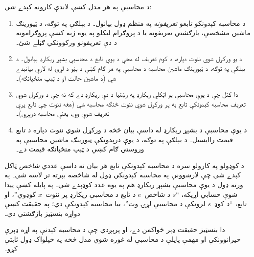 \documentclass[../../../include/open-logic-section]{subfiles}
\begin{document}

د محاسبې په هر مدل کښې لاندې کارونه کېدے شي:
\begin{enumerate}
\item د محاسبه کېدونکو تابعو \emph{تعريفونه} په منظم ډول بيانول۔ د
  بېلګې په توګه، د ټيورينګ ماشين مشخصې، بازګشتي تعريفونه يا د پروګرام
  ليکلو په يوه ژبه کښې پروګرامونه د دې تعريفونو ورکوونکي ګڼلے شئ۔
\item د يو ورکړل شوي ننوت دپاره، د کوم تعريف له مخې د يوې تابع د
  محاسبې بشپړ ريکارډ بيانول۔ د بېلګې په توګه، د ټيورينګ ماشين محاسبه
  د محاسبې په هر ګام کښې د بڼو د لړۍ له لارې بيانېدے شي (د ماشين
  حالت او د ټېپ منځپانګه)۔
\item دا کتل چې د يوې محاسبې يو اټکلي ريکارډ په رښتيا د دې ريکارډ دے
  که نه چې د ورکړل شوي تعريف محاسبه کېدونکې تابع به پر ورکړل شوي ننوت
  څنګه محاسبه شي (هغه ننوت چې تابع پرې تعريف شوې وي، يعنې محاسبه
  درېږي)۔
\item د يوې محاسبې د بشپړ ريکارډ له داسې بيان څخه د ورکړل شوي ننوت
  دپاره د تابع قيمت راايستل۔ د بېلګې په توګه، د يوې درېدونکې ټيورينګ
  ماشين محاسبې په وروستي ګام کښې د ټېپ منځپانګه قيمت دے۔
\end{enumerate}

د کوډولو په کارولو سره د محاسبه کېدونکې تابع هر بيان ته داسې عددي
\emph{شاخص} ټاکل کېدے شي چې لارښوونې په محاسبه کېدونکي ډول له شاخصه
بېرته تر لاسه شي۔ په ورته ډول د يوې محاسبې بشپړ ريکارډ هم په يوه عدد
کوډېدے شي۔ په پايله کښې پيدا شوې حسابي اړيکه، ``$s$ د شاخص~$e$ د تابع
د محاسبې ريکارډ پر ننوت~$x$ کوډوي''، او تابع، ``د کوډ~$s$ لرونکې د
محاسبې لړۍ وت''، بيا محاسبه کېدونکې دي؛ په حقيقت کښې دواړه بنسټيز
بازګشتي دي۔

دا بنسټيز حقيقت ډېر ځواکمن دے، او پرېږدي چې د محاسبه کېدنې په اړه ډېرې
حيرانوونکې او مهمې پايلې د محاسبې له غوره شوي مدل څخه په خپلواک ډول
ثابتې کړو۔
\end{document}
